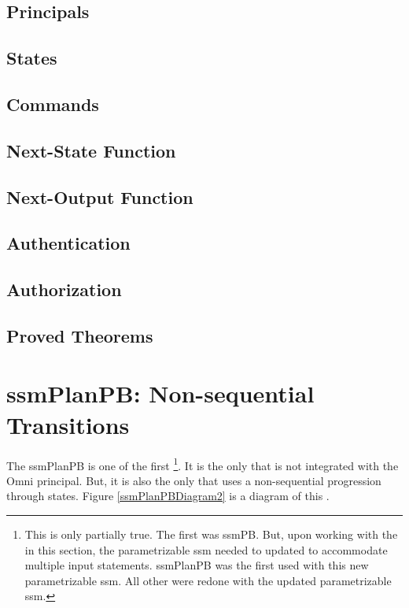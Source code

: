 \documentclass[../../main/main.tex]{subfiles}
\begin{document}
\subsection{Principals}
\subsection{States}
\subsection{Commands}
\subsection{Next-State Function}
\subsection{Next-Output Function}
\subsection{Authentication}
\HOLssmPlanPBTheoremsinputOKXXdef


\HOLPBIntegratedDefTheoremsgetOmniCommandXXdef


\subsection{Authorization}
\subsection{Proved Theorems}



\section{ssmPlanPB: Non-sequential Transitions}
The ssmPlanPB  is one of the first \footnote{This is only partially true.  The first  was ssmPB.  But, upon working with the  in this section, the parametrizable ssm needed to updated to accommodate multiple input statements.  ssmPlanPB was the first  used with this new parametrizable ssm.  All other  were redone with the updated parametrizable ssm.}. It is the only  that is not integrated with the Omni principal.  But, it is also the only  that uses a non-sequential progression through states.  Figure \ref{ssmPlanPBDiagram2} is a diagram of this .
\end{document}
